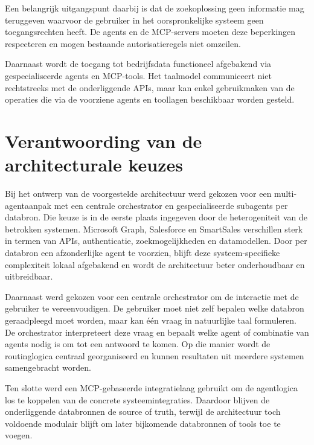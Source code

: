 Een belangrijk uitgangspunt daarbij is dat de zoekoplossing geen informatie mag teruggeven waarvoor de gebruiker in het oorspronkelijke systeem geen toegangsrechten heeft. De agents en de \gls{MCP}-servers moeten deze beperkingen respecteren en mogen bestaande autorisatieregels niet omzeilen.

Daarnaast wordt de toegang tot bedrijfsdata functioneel afgebakend via gespecialiseerde agents en \gls{MCP}-tools. Het taalmodel communiceert niet rechtstreeks met de onderliggende \glspl{API}, maar kan enkel gebruikmaken van de operaties die via de voorziene agents en toollagen beschikbaar worden gesteld.





\section{Verantwoording van de architecturale keuzes}
\label{sec:verantwoording-keuzes}

Bij het ontwerp van de voorgestelde architectuur werd gekozen voor een multi-agentaanpak met een centrale orchestrator en gespecialiseerde subagents per databron. Die keuze is in de eerste plaats ingegeven door de heterogeniteit van de betrokken systemen. Microsoft Graph, Salesforce en SmartSales verschillen sterk in termen van APIs, authenticatie, zoekmogelijkheden en datamodellen. Door per databron een afzonderlijke agent te voorzien, blijft deze systeem-specifieke complexiteit lokaal afgebakend en wordt de architectuur beter onderhoudbaar en uitbreidbaar.

Daarnaast werd gekozen voor een centrale orchestrator om de interactie met de gebruiker te vereenvoudigen. De gebruiker moet niet zelf bepalen welke databron geraadpleegd moet worden, maar kan één vraag in natuurlijke taal formuleren. De orchestrator interpreteert deze vraag en bepaalt welke agent of combinatie van agents nodig is om tot een antwoord te komen. Op die manier wordt de routinglogica centraal georganiseerd en kunnen resultaten uit meerdere systemen samengebracht worden.

Ten slotte werd een MCP-gebaseerde integratielaag gebruikt om de agentlogica los te koppelen van de concrete systeemintegraties. Daardoor blijven de onderliggende databronnen de source of truth, terwijl de architectuur toch voldoende modulair blijft om later bijkomende databronnen of tools toe te voegen.
